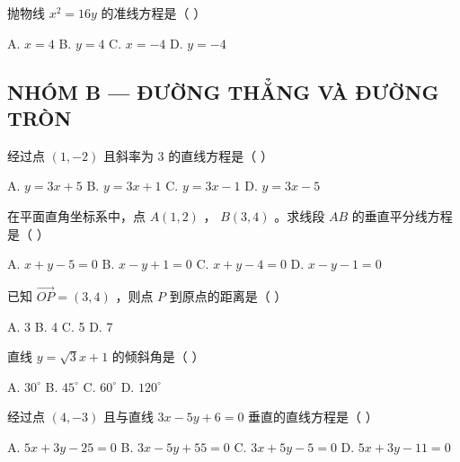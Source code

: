 \documentclass[11pt, a4paper]{article}
\begin{document}
\begin{baitap}[12]
抛物线 $x^2 = 16y$ 的准线方程是（ ）
\par\vspace{3pt}
\noindent A. $x = 4$ \quad B. $y = 4$ \quad C. $x = -4$ \quad D. $y = -4$
\end{baitap}

\subsection*{NHÓM B — ĐƯỜNG THẲNG VÀ ĐƯỜNG TRÒN}

\begin{baitap}[13]
经过点 $(1, -2)$ 且斜率为 $3$ 的直线方程是（ ）
\par\vspace{3pt}
\noindent A. $y = 3x + 5$ \quad B. $y = 3x + 1$ \quad C. $y = 3x - 1$ \quad D. $y = 3x - 5$
\end{baitap}

\begin{baitap}[14]
在平面直角坐标系中，点 $A(1,2)$ ， $B(3,4)$ 。求线段 $AB$ 的垂直平分线方程是（ ）
\par\vspace{3pt}
\noindent A. $x + y - 5 = 0$ \quad B. $x - y + 1 = 0$ \quad C. $x + y - 4 = 0$ \quad D. $x - y - 1 = 0$
\end{baitap}

\begin{baitap}[15]
已知 $\overrightarrow{OP} = (3,4)$ ，则点 $P$ 到原点的距离是（ ）
\par\vspace{3pt}
\noindent A. 3 \quad B. 4 \quad C. 5 \quad D. 7
\end{baitap}

\begin{baitap}[16]
直线 $y = \sqrt{3}x + 1$ 的倾斜角是（ ）
\par\vspace{3pt}
\noindent A. $30^\circ$ \quad B. $45^\circ$ \quad C. $60^\circ$ \quad D. $120^\circ$
\end{baitap}

\begin{baitap}[17]
经过点 $(4,-3)$ 且与直线 $3x - 5y + 6 = 0$ 垂直的直线方程是（ ）
\par\vspace{3pt}
\noindent A. $5x + 3y - 25 = 0$ \quad B. $3x - 5y + 55 = 0$ \quad C. $3x + 5y - 5 = 0$ \quad D. $5x + 3y - 11 = 0$
\end{baitap}
\end{document}
